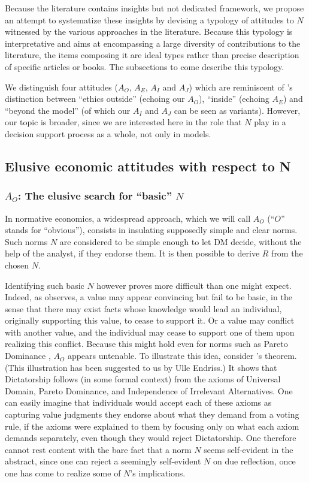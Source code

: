 \documentclass[preprint, french, english, 11pt, authoryear]{elsarticle}%
\newcommand{\protectforpdf}[1]{\texorpdfstring{\ensuremath{#1}}{#1}}
\newcommand{\possessivecite}[1]{\citeauthor{#1}’s \citeyearpar{#1}}
\begin{document}
\begin{changebar}
Because the literature contains insights but not dedicated framework, we propose an attempt to systematize these insights by devising a typology of attitudes to $N$ witnessed by the various approaches in the literature. 
Because this typology is interpretative and aims at encompassing a large diversity of contributions to the literature, the items composing it are ideal types rather than precise description of specific articles or books.
 The subsections to come describe this typology. 
\end{changebar}We distinguish four attitudes ($A_O$, $A_E$, $A_I$ and $A_J$) which are reminiscent of \possessivecite{le_menestrel_ethics_2004} distinction between ``ethics outside'' (echoing our $A_O$), ``inside'' (echoing $A_E$) and ``beyond the model'' (of which our $A_I$ and $A_J$ can be seen as variants). 
 However, our topic is broader, since we are interested here in the role that $N$ play in a decision support process as a whole, not only in models.


\subsection{Elusive economic attitudes with respect to N}%
\subsubsection{\texorpdfstring{$A_O$}{AO}: The elusive search for ``basic'' \protectforpdf{N}}
In normative economics, a widespread approach, which we will call $A_O$ (``$O$'' stands for “obvious”), consists in insulating supposedly simple and clear norms. 
Such norms $N$ are considered to be simple enough to let DM%
 decide, without the help of the analyst, if they endorse them. It is then possible to derive $R$ from the chosen $N$.

Identifying such basic $N$ however proves more difficult than one might expect. 
Indeed, as \citet{sen_nature_1967} observes, a value may appear convincing but fail to be basic, in the sense that there may exist facts whose knowledge would lead an individual, originally supporting this value, to cease to support it. 
Or a value may conflict with another value, and the individual may cease to support one of them upon realizing this conflict.
Because this might hold even for norms such as Pareto Dominance \citep[ch. 5 and 6]{sen_collective_1984}, $A_O$ appears untenable.
To illustrate this idea, consider \possessivecite{arrow_social_2012} theorem. (This illustration has been suggested to us by Ulle Endriss.)
It shows that Dictatorship follows (in some formal context) from the axioms of Universal Domain, Pareto Dominance, and Independence of Irrelevant Alternatives.
One can easily imagine that individuals would accept each of these axioms as capturing value judgments they endorse about what they demand from a voting rule, if the axioms were explained to them by focusing only on what each axiom demands separately, even though they would reject Dictatorship.
One therefore cannot rest content with the bare fact that a norm $N$ seems self-evident in the abstract, since one can reject a seemingly self-evident $N$ on due reflection, once one has come to realize some of $N$'s implications.
\end{document}
